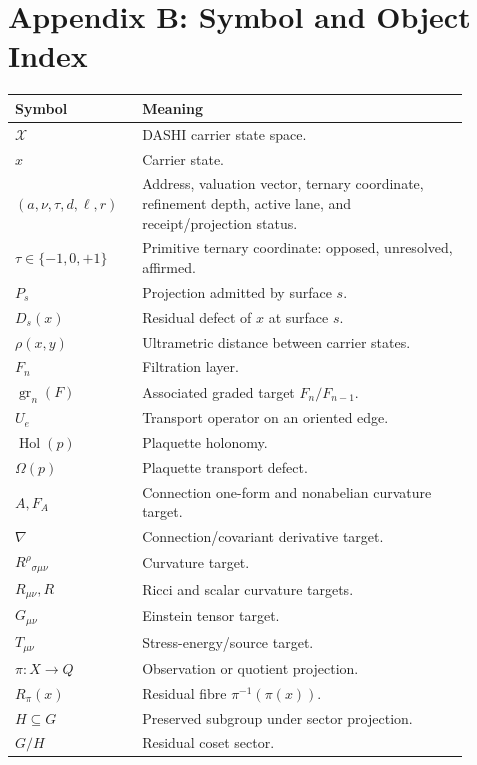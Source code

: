 \documentclass[11pt]{article}
\theoremstyle{definition}
\theoremstyle{plain}
\theoremstyle{remark}
\begin{document}
\section*{Appendix B: Symbol and Object Index}
\renewcommand{\arraystretch}{1.12}
\begin{longtable}{p{0.24\linewidth}p{0.66\linewidth}}
\toprule
Symbol & Meaning \\
\midrule
\(\mathcal X\) & DASHI carrier state space. \\
\(x\) & Carrier state. \\
\((a,\nu,\tau,d,\ell,r)\) & Address, valuation vector, ternary coordinate,
refinement depth, active lane, and receipt/projection status. \\
\(\tau\in\{-1,0,+1\}\) & Primitive ternary coordinate: opposed, unresolved,
affirmed. \\
\(P_s\) & Projection admitted by surface \(s\). \\
\(D_s(x)\) & Residual defect of \(x\) at surface \(s\). \\
\(\rho(x,y)\) & Ultrametric distance between carrier states. \\
\(F_n\) & Filtration layer. \\
\(\operatorname{gr}_n(F)\) & Associated graded target \(F_n/F_{n-1}\). \\
\(U_e\) & Transport operator on an oriented edge. \\
\(\operatorname{Hol}(p)\) & Plaquette holonomy. \\
\(\Omega(p)\) & Plaquette transport defect. \\
\(A,F_A\) & Connection one-form and nonabelian curvature target. \\
\(\nabla\) & Connection/covariant derivative target. \\
\(R^\rho{}_{\sigma\mu\nu}\) & Curvature target. \\
\(R_{\mu\nu},R\) & Ricci and scalar curvature targets. \\
\(G_{\mu\nu}\) & Einstein tensor target. \\
\(T_{\mu\nu}\) & Stress-energy/source target. \\
\(\pi:X\to Q\) & Observation or quotient projection. \\
\(R_\pi(x)\) & Residual fibre \(\pi^{-1}(\pi(x))\). \\
\(H\subseteq G\) & Preserved subgroup under sector projection. \\
\(G/H\) & Residual coset sector. \\
\bottomrule
\end{longtable}
\renewcommand{\arraystretch}{1.0}
\end{document}
